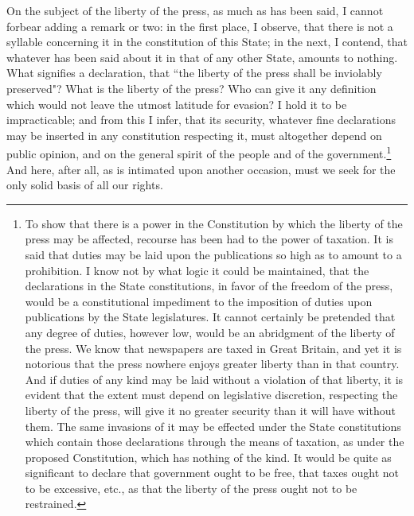 On the subject of the liberty of the press, as much as has been said, I cannot forbear adding a remark or two: in the first place, I observe, that there is not a syllable concerning it in the constitution of this State; in the next, I contend, that whatever has been said about it in that of any other State, amounts to nothing. What signifies a declaration, that ``the liberty of the press shall be inviolably preserved"? What is the liberty of the press? Who can give it any definition which would not leave the utmost latitude for evasion? I hold it to be impracticable; and from this I infer, that its security, whatever fine declarations may be inserted in any constitution respecting it, must altogether depend on public opinion, and on the general spirit of the people and of the government.\footnote{To show that there is a power in the Constitution by which the liberty of the press may be affected, recourse has been had to the power of taxation. It is said that duties may be laid upon the publications so high as to amount to a prohibition. I know not by what logic it could be maintained, that the declarations in the State constitutions, in favor of the freedom of the press, would be a constitutional impediment to the imposition of duties upon publications by the State legislatures. It cannot certainly be pretended that any degree of duties, however low, would be an abridgment of the liberty of the press. We know that newspapers are taxed in Great Britain, and yet it is notorious that the press nowhere enjoys greater liberty than in that country. And if duties of any kind may be laid without a violation of that liberty, it is evident that the extent must depend on legislative discretion, respecting the liberty of the press, will give it no greater security than it will have without them. The same invasions of it may be effected under the State constitutions which contain those declarations through the means of taxation, as under the proposed Constitution, which has nothing of the kind. It would be quite as significant to declare that government ought to be free, that taxes ought not to be excessive, etc., as that the liberty of the press ought not to be restrained.} And here, after all, as is intimated upon another occasion, must we seek for the only solid basis of all our rights.

